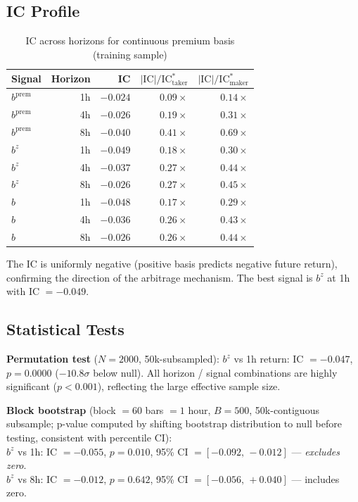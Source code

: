 \documentclass[12pt, a4paper]{article}
\theoremstyle{definition}
\newcommand{\IC}{\mathrm{IC}}
\begin{document}
\subsection{IC Profile}

\begin{table}[H]
\centering
\caption{IC across horizons for continuous premium basis (training sample)}
\label{tab:e_ic}
\begin{tabular}{lrrrr}
\toprule
Signal & Horizon & IC & $|\IC|/\IC^*_{\text{taker}}$ & $|\IC|/\IC^*_{\text{maker}}$ \\
\midrule
$b^{\text{prem}}$ & 1h  & $-0.024$ & $0.09\times$ & $0.14\times$ \\
$b^{\text{prem}}$ & 4h  & $-0.026$ & $0.19\times$ & $0.31\times$ \\
$b^{\text{prem}}$ & 8h  & $-0.040$ & $0.41\times$ & $0.69\times$ \\
\midrule
$b^z$             & 1h  & $-0.049$ & $0.18\times$ & $0.30\times$ \\
$b^z$             & 4h  & $-0.037$ & $0.27\times$ & $0.44\times$ \\
$b^z$             & 8h  & $-0.026$ & $0.27\times$ & $0.45\times$ \\
\midrule
$\hat{b}$         & 1h  & $-0.048$ & $0.17\times$ & $0.29\times$ \\
$\hat{b}$         & 4h  & $-0.036$ & $0.26\times$ & $0.43\times$ \\
$\hat{b}$         & 8h  & $-0.026$ & $0.26\times$ & $0.44\times$ \\
\bottomrule
\end{tabular}
\end{table}

The IC is uniformly negative (positive basis predicts negative future return),
confirming the direction of the arbitrage mechanism. The best signal is $b^z$
at 1h with IC $= -0.049$.

\subsection{Statistical Tests}

\textbf{Permutation test} ($N = 2000$, 50k-subsampled):
$b^z$ vs 1h return: IC $= -0.047$, $p = 0.0000$ ($-10.8\sigma$ below null).
All horizon / signal combinations are highly significant ($p < 0.001$),
reflecting the large effective sample size.

\textbf{Block bootstrap} (block $= 60$ bars $= 1$ hour, $B = 500$,
50k-contiguous subsample; p-value computed by shifting bootstrap distribution
to null before testing, consistent with percentile CI):\\
$b^z$ vs 1h: IC $= -0.055$, $p = 0.010$, 95\% CI $= [-0.092,\,-0.012]$ — \emph{excludes zero}.\\
$b^z$ vs 8h: IC $= -0.012$, $p = 0.642$, 95\% CI $= [-0.056,\,+0.040]$ — includes zero.
\end{document}
